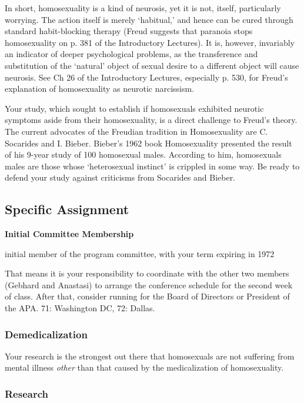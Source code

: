 \begin{refsection}
In short, homosexuality is a kind of neurosis, yet it is not, itself, particularly worrying. The action itself is merely `habitual,' and hence can be cured through standard habit-blocking therapy (Freud suggests that paranoia stops homosexuality on p. 381 of the Introductory Lectures). It is, however, invariably an indicator of deeper psychological problems, as the transference and substitution of the `natural' object of sexual desire to a different object will cause neurosis. See Ch 26 of the Introductory Lectures, especially p. 530, for Freud's explanation of homosexuality as neurotic narcissism.

Your study, which sought to establish if homosexuals exhibited neurotic symptoms aside from their homosexuality, is a direct challenge to Freud's theory. The current advocates of the Freudian tradition in Homosexuality are C. Socarides and I. Bieber. Bieber's 1962 book Homosexuality presented the result of his 9-year study of 100 homosexual males. According to him, homosexuals males are those whose `heterosexual instinct' is crippled in some way. Be ready to defend your study against criticisms from Socarides and Bieber.

\subsection{Specific Assignment}
\label{specificassignment}

\textbf{Initial Committee Membership}
\begin{service}[Hooker]\label{service:hooker}
initial member of the program committee, with your term expiring in 1972
\end{service}

That means it is your responsibility to coordinate with the other two members (Gebhard and Anastasi) to arrange the conference schedule for the second week of class. After that, consider running for the Board of Directors or President of the APA. 71: Washington DC, 72: Dallas.

\subsubsection{Demedicalization}
\label{demedicalization}

Your research is the strongest out there that homosexuals are not suffering from mental illness \emph{other} than that caused by the medicalization of homosexuality.

\subsubsection{Research}
\label{research}


\end{refsection}
